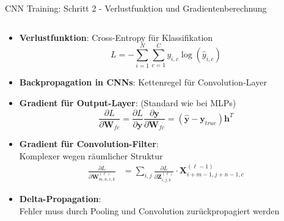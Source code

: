 \documentclass[aspectratio=1610, xcolor=dvipsnames, 9pt]{beamer}
\begin{document}
      \begin{frame}{CNN Training: Schritt 2 - Verlustfunktion und Gradientenberechnung}
        \begin{columns}
          \begin{column}{1\textwidth}
            \begin{itemize}
              \item \textbf{Verlustfunktion}: Cross-Entropy für Klassifikation
              \begin{equation}
                L = -\sum_{i=1}^{N} \sum_{c=1}^{C} y_{i,c} \log(\hat{y}_{i,c})
              \end{equation}
              \item \textbf{Backpropagation in CNNs}: Kettenregel für Convolution-Layer
              \item \textbf{Gradient für Output-Layer}: (Standard wie bei MLPs)
              \begin{equation}
                \frac{\partial L}{\partial \mathbf{W}_{fc}} = \frac{\partial L}{\partial \mathbf{y}} \frac{\partial \mathbf{y}}{\partial \mathbf{W}_{fc}} = (\hat{\mathbf{y}} - \mathbf{y}_{true}) \mathbf{h}^T
              \end{equation}
              \item \textbf{Gradient für Convolution-Filter}: \\
                    Komplexer wegen räumlicher Struktur
              \begin{align}
                \frac{\partial L}{\partial \mathbf{W}^{(\ell)}_{m,n,c,k}} &= \sum_{i,j} \frac{\partial L}{\partial \mathbf{Z}^{(\ell)}_{i,j,k}} \cdot \mathbf{X}^{(\ell-1)}_{i+m-1,j+n-1,c}
              \end{align}
              \item \textbf{Delta-Propagation}: \\
                    Fehler muss durch Pooling und Convolution zurückpropagiert werden
            \end{itemize}
          \end{column}
        \end{columns}
      \end{frame}
\end{document}

